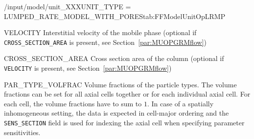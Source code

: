 \begin{condsubgroup}{/input/model/unit\_XXX}{UNIT\_TYPE = LUMPED\_RATE\_MODEL\_WITH\_PORES}{tab:FFModelUnitOpLRMP}
\begin{dataset}[unit=--,type=double,range={$(0, 1]
  \end{dataset}
  \begin{dataset}[unit=\si{\metre\per\second},type=double,range={$\mathds{R}$},length={1 / \texttt{NSEC}}]{VELOCITY}
    Interstitial velocity of the mobile phase (optional if \texttt{CROSS\_SECTION\_AREA} is present, see Section~\ref{par:MUOPGRMflow})
  \end{dataset}
  \begin{dataset}[unit=\si{\square\metre},type=double,range={$>0$},length={1}]{CROSS\_SECTION\_AREA}
    Cross section area of the column (optional if \texttt{VELOCITY} is present, see Section~\ref{par:MUOPGRMflow})
  \end{dataset}
  \begin{dataset}[unit=--,type=double,range={$[0,1]$},length={\texttt{NPARTYPE} / $\texttt{NCOL} \cdot \texttt{NPARTYPE}$}]{PAR\_TYPE\_VOLFRAC}
    Volume fractions of the particle types.
    The volume fractions can be set for all axial cells together or for each individual axial cell.
    For each cell, the volume fractions have to sum to $1$.
    In case of a spatially inhomogeneous setting, the data is expected in cell-major ordering and the \texttt{SENS\_SECTION} field is used for indexing the axial cell when specifying parameter sensitivities.
  \end{dataset}
\end{condsubgroup}

